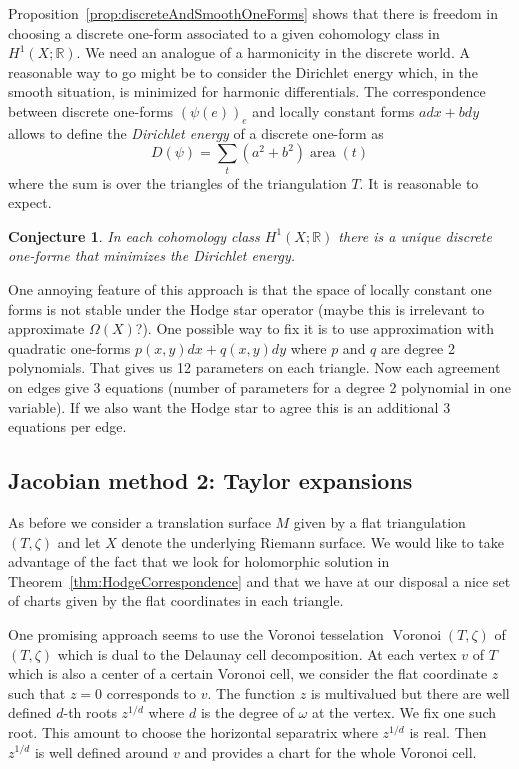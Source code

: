 \documentclass[a4paper,12pt]{article}
\def\bR{\mathbb{R}}
\def\area{\operatorname{area}}
\def\Voronoi{\operatorname{Voronoi}}
\newtheorem{conjecture}[definition]{Conjecture}
\begin{document}
Proposition~\ref{prop:discreteAndSmoothOneForms} shows that there is freedom
in choosing a discrete one-form associated to a given cohomology class in $H^1(X; \bR)$.
We need an analogue of a harmonicity in the discrete world.
A reasonable way to go might be to consider the Dirichlet
energy which, in the smooth situation, is minimized for harmonic differentials.
The correspondence between discrete one-forms $(\psi(e))_e$ and locally constant
forms $adx + bdy$ allows to define the \emph{Dirichlet energy} of a discrete one-form as
\[
D(\psi) = \sum_{t} (a^2 + b^2) \area(t)
\]
where the sum is over the triangles of the triangulation $T$.
It is reasonable to expect.
\begin{conjecture}
In each cohomology class $H^1(X; \bR)$ there is a unique discrete one-forme
that minimizes the Dirichlet energy.
\end{conjecture}

One annoying feature of this approach is that the space of locally constant
one forms is not stable under the Hodge star operator (maybe this is
irrelevant to approximate $\Omega(X)$?). One possible way to fix it is to use
approximation with quadratic one-forms $p(x,y) dx + q(x,y) dy$ where $p$ and $q$
are degree 2 polynomials. That gives us 12 parameters on each triangle. Now each
agreement on edges give 3 equations (number of parameters for a degree 2 polynomial
in one variable). If we also want the Hodge star to agree this is an additional
3 equations per edge.

\subsection{Jacobian method 2: Taylor expansions}
As before we consider a translation surface $M$ given by a flat triangulation $(T, \zeta)$
and let $X$ denote the underlying Riemann surface. We would like to take advantage of
the fact that we look for holomorphic solution in Theorem~\ref{thm:HodgeCorrespondence}
and that we have at our disposal a nice set of charts given by the flat coordinates in each triangle.

One promising approach seems to use the Voronoi tesselation $\Voronoi(T,
\zeta)$ of $(T, \zeta)$ which is dual to the Delaunay cell decomposition. At
each vertex $v$ of $T$ which is also a center of a certain Voronoi cell, we
consider the flat coordinate $z$ such that $z=0$ corresponds to $v$. The
function $z$ is multivalued but there are well defined $d$-th roots $z^{1/d}$ where $d$ is the
degree of $\omega$ at the vertex. We fix one such root. This amount to choose the
horizontal separatrix where $z^{1/d}$ is real. Then $z^{1/d}$ is well defined around $v$ and
provides a chart for the whole Voronoi cell.
\end{document}
